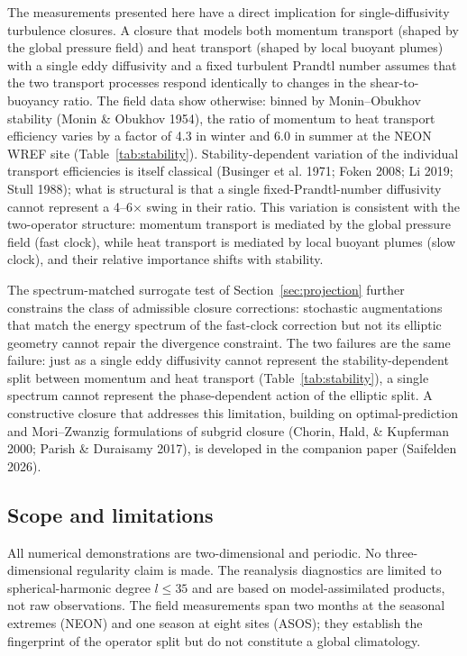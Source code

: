 \documentclass[11pt]{article}
\begin{document}
The measurements presented here have a direct implication for single-diffusivity
turbulence closures. A closure that models both momentum transport (shaped by the
global pressure field) and heat transport (shaped by local buoyant plumes) with a
single eddy diffusivity and a fixed turbulent Prandtl number assumes that the two
transport processes respond identically to changes in the shear-to-buoyancy ratio.
The field data show otherwise: binned by Monin--Obukhov stability (Monin \&
Obukhov 1954), the ratio of momentum to heat transport efficiency varies by a
factor of 4.3 in winter and 6.0 in summer at the NEON WREF site
(Table~\ref{tab:stability}). Stability-dependent variation of the individual
transport efficiencies is itself classical (Businger et al. 1971; Foken 2008;
Li 2019; Stull 1988); what is structural is that a single
fixed-Prandtl-number diffusivity cannot represent a 4--6$\times$ swing in their
ratio. This variation is consistent with the two-operator structure: momentum
transport is mediated by the global pressure field (fast clock), while heat
transport is mediated by local buoyant plumes (slow clock), and their relative
importance shifts with stability.

The spectrum-matched surrogate test of Section~\ref{sec:projection} further
constrains the class of admissible closure corrections: stochastic augmentations
that match the energy spectrum of the fast-clock correction but not its elliptic
geometry cannot repair the divergence constraint. The two failures are the same
failure: just as a single eddy diffusivity cannot represent the
stability-dependent split between momentum and heat transport
(Table~\ref{tab:stability}), a single spectrum cannot represent the
phase-dependent action of the elliptic split. A constructive closure that
addresses this limitation, building on optimal-prediction and Mori--Zwanzig
formulations of subgrid closure (Chorin, Hald, \& Kupferman 2000; Parish \&
Duraisamy 2017), is developed in the companion paper (Saifelden 2026).

\subsection{Scope and limitations}

All numerical demonstrations are two-dimensional and periodic. No
three-dimensional regularity claim is made. The reanalysis diagnostics are limited
to spherical-harmonic degree $l \leq 35$ and are based on model-assimilated
products, not raw observations. The field measurements span two months at the
seasonal extremes (NEON) and one season at eight sites (ASOS); they establish the
fingerprint of the operator split but do not constitute a global climatology.
\end{document}
